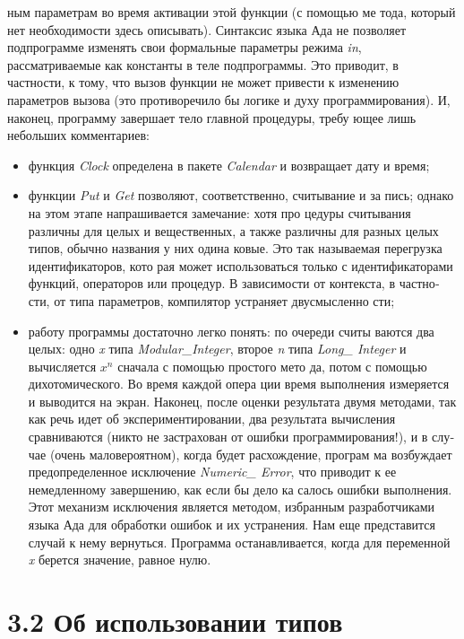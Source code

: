 \documentclass{mai_book}
\begin{document}
ным параметрам во время активации этой функции (с помощью ме­
тода, который нет необходимости здесь описывать). Синтаксис языка
Ада не позволяет подпрограмме изменять свои формальные параметры
режима {\it in}, рассматриваемые как константы в теле подпрограммы. Это
приводит, в частности, к тому, что вызов функции не может привести
к изменению параметров вызова (это противоречило бы логике и духу
программирования).
И, наконец, программу завершает тело главной процедуры, требу­
ющее лишь небольших комментариев:

\begin{itemize}
\item функция {\it Clock} определена в пакете {\it Calendar} и возвращает дату и
время;
\item функции {\it Put} и {\it Get} позволяют, соответственно, считывание и за­
пись; однако на этом этапе напрашивается замечание: хотя про­
цедуры считывания различны для целых и вещественных, а также
различны для разных целых типов, обычно названия у них одина­
ковые. Это так называемая перегрузка идентификаторов, кото­
рая может использоваться только с идентификаторами функций,
операторов или процедур. В зависимости от контекста, в частно­
сти, от типа параметров, компилятор устраняет двусмысленно­
сти;
\item работу программы достаточно легко понять: по очереди считы­
ваются два целых: одно {\it x} типа {\it Modular\_Integer}, второе {\it n} типа
{\it Long\_ Integer} и вычисляется {\it $x^n$} сначала с помощью простого мето­
да, потом с помощью дихотомического. Во время каждой опера­
ции время выполнения измеряется и выводится на экран. Наконец,
после оценки результата двумя методами, так как речь идет об
экспериментировании, два результата вычисления сравниваются
(никто не застрахован от ошибки программирования!), и в слу­
чае (очень маловероятном), когда будет расхождение, програм­
ма возбуждает предопределенное исключение {\it Numeric\_ Error}, что
приводит к ее немедленному завершению, как если бы дело ка­
салось ошибки выполнения. Этот механизм исключения является
методом, избранным разработчиками языка Ада для обработки
ошибок и их устранения. Нам еще представится случай к нему
вернуться. Программа останавливается, когда для переменной {\it x}
берется значение, равное нулю.
\end{itemize}
\newpage

\section{ 3.2 Об использовании типов}
\end{document}
